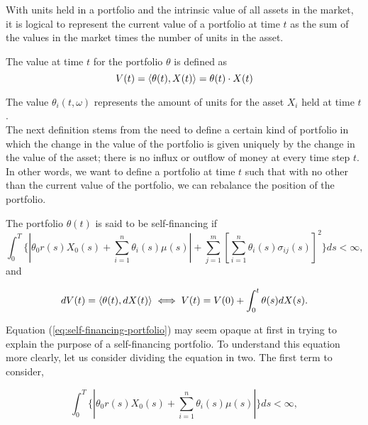 \documentclass[../TGMAFFIRO.tex]{subfiles}
\begin{document}
With units held in a portfolio and the intrinsic value of all assets in the market, it is logical to represent the current value of a portfolio at time $t$ as the sum of the values in the market times the number of units in the asset. 
\begin{definition}
	The value at time $t$ for the portfolio $\theta$ is defined as
	\begin{equation}
		V(t) = \langle \theta(t), X(t)\rangle = \theta(t) \cdot X(t)
	\end{equation}
\end{definition}
The value $\theta_i(t,\omega)$ represents the amount of units for the asset $X_i$ held at time $t$.\\

The next definition stems from the need to define a certain kind of portfolio in which the change in the value of the portfolio is given uniquely by the change in the value of the asset; there is no influx or outflow of money at every time step $t$. In other words, we want to define a portfolio at time $t$ such that with no other than the current value of the portfolio, we can rebalance the position of the portfolio.

\begin{definition}\label{def:self-financing-portfolio}
	The portfolio $\theta(t)$ is said to be self-financing if
	\begin{equation} \label{eq:self-financing-portfolio}
	\int_0^T\{|\theta_0r(s)X_0(s) + \sum_{i=1}^{n}\theta_i(s)\mu(s)| + \sum_{j=1}^m\left[\sum_{i=1}^n\theta_i(s)\sigma_{ij}(s)\right]^2\} ds < \infty,
	\end{equation} 
and 

\begin{equation} \label{eq:self-financing-value-process}
  dV(t) = \langle \theta(t), dX(t)\rangle \iff V(t) = V(0)  + \int_0^t \theta(s) dX(s).
\end{equation}
\end{definition}

Equation (\ref{eq:self-financing-portfolio}) may seem opaque at first in trying to explain the purpose of a self-financing portfolio. To understand this equation more clearly, let us consider dividing the equation in two. The first term to consider,

\begin{equation}\label{eq:pt1-self-fin-port}
\int_0^T\{|\theta_0r(s)X_0(s) + \sum_{i=1}^{n}\theta_i(s)\mu(s)|\} ds < \infty,
\end{equation} 
\end{document}
